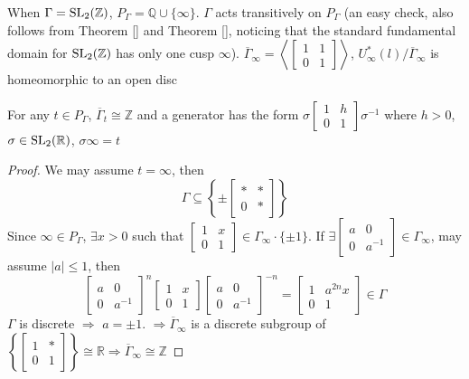 \documentclass[main]{subfiles}
\begin{document}
\begin{example}
When $\Gamma=\operatorname{SL}_2(\mathbb Z)$, $P_\Gamma=\mathbb Q\cup\{\infty\}$. $\Gamma$ acts transitively on $P_\Gamma$ (an easy check, also follows from Theorem \ref{} and Theorem \ref{}, noticing that the standard fundamental domain for $\operatorname{SL}_2(\mathbb Z)$ has only one cusp $\infty$). $\overline\Gamma_\infty=\left\langle\begin{bmatrix}
1&1 \\
0&1
\end{bmatrix}\right\rangle$, $U^*_\infty(l)/\overline\Gamma_\infty$ is homeomorphic to an open disc
\end{example}

\begin{lemma}
For any $t\in P_\Gamma$, $\overline\Gamma_t\cong\mathbb Z$ and a generator has the form $\sigma\begin{bmatrix}
1&h \\
0&1
\end{bmatrix}\sigma^{-1}$ where $h>0$, $\sigma\in\operatorname{SL}_2(\mathbb R)$, $\sigma\infty=t$
\end{lemma}

\begin{proof}
We may assume $t=\infty$, then
\[\Gamma\subseteq\left\{\pm\begin{bmatrix}
*&* \\
0&*
\end{bmatrix}\right\}\]
Since $\infty\in P_\Gamma$, $\exists x>0$ such that $\begin{bmatrix}
1& x\\
0&1
\end{bmatrix}\in\Gamma_\infty\cdot\{\pm1\}$. If $\exists\begin{bmatrix}
a&0 \\
0&a^{-1}
\end{bmatrix}\in\Gamma_\infty$, may assume $|a|\leq1$, then
\[\begin{bmatrix}
a&0 \\
0&a^{-1}
\end{bmatrix}^n\begin{bmatrix}
1&x \\
0&1
\end{bmatrix}\begin{bmatrix}
a&0 \\
0&a^{-1}
\end{bmatrix}^{-n}=\begin{bmatrix}
1&a^{2n}x \\
0&1
\end{bmatrix}\in\Gamma\]
$\Gamma$ is discrete $\Rightarrow$ $a=\pm1$. $\Rightarrow\overline\Gamma_\infty$ is a discrete subgroup of $\left\{\begin{bmatrix}
1&* \\
0&1
\end{bmatrix}\right\}\cong\mathbb R\Rightarrow\overline\Gamma_\infty\cong\mathbb Z$
\end{proof}
\end{document}
